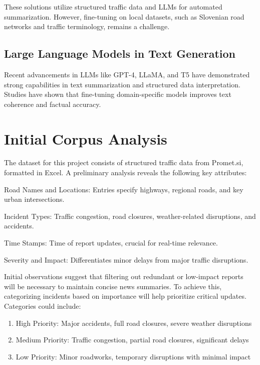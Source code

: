 \documentclass[fleqn,moreauthors,10pt]{ds_report}
\begin{document}
These solutions utilize structured traffic data and LLMs for automated summarization. However, fine-tuning on local datasets, such as Slovenian road networks and traffic terminology, remains a challenge.

\subsection*{Large Language Models in Text Generation}

Recent advancements in LLMs like GPT-4, LLaMA, and T5 have demonstrated strong capabilities in text summarization and structured data interpretation. Studies have shown that fine-tuning domain-specific models improves text coherence and factual accuracy.

\section*{Initial Corpus Analysis}

The dataset for this project consists of structured traffic data from Promet.si, formatted in Excel. A preliminary analysis reveals the following key attributes:

Road Names and Locations: Entries specify highways, regional roads, and key urban intersections.

Incident Types: Traffic congestion, road closures, weather-related disruptions, and accidents.

Time Stamps: Time of report updates, crucial for real-time relevance.

Severity and Impact: Differentiates minor delays from major traffic disruptions.

Initial observations suggest that filtering out redundant or low-impact reports will be necessary to maintain concise news summaries. To achieve this, categorizing incidents based on importance will help prioritize critical updates. Categories could include:

\begin{enumerate}[noitemsep] 
	\item High Priority: Major accidents, full road closures, severe weather disruptions
    
	\item Medium Priority: Traffic congestion, partial road closures, significant delays
    
	\item Low Priority: Minor roadworks, temporary disruptions with minimal impact
\end{enumerate}
\end{document}
